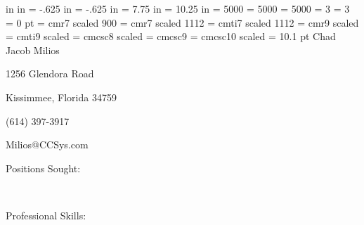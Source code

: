  in
 in
\hoffset = -.625 in%
\voffset = -.625 in%
\hsize = 7.75 in%
\vsize = 10.25 in%
\nopagenumbers%
\tolerance = 5000%
\hyphenpenalty = 5000%
\exhyphenpenalty = 5000%
\lefthyphenmin = 3%
\righthyphenmin = 3%
\parindent = 0 pt%
\font\myfp = cmr7 scaled 900%
\font\myrm = cmr7 scaled 1112%
\font\myit = cmti7 scaled 1112%
\font\mybigrm = cmr9 scaled \magstephalf%
\font\mybigit = cmti9 scaled \magstephalf%
\font\mylilcsc = cmcsc8 scaled \magstephalf%
\font\mycsc = cmcsc9%
\font\mybigcsc = cmcsc10 scaled %
\baselineskip = 10.1 pt
{%
	\mybigcsc%
	\hfil%
	Chad Jacob Milios%
	\hfil%
}%
\smallskip%
{%
	\mycsc%
	\hfil%
	1256 Glendora Road%
	\hfil%
	\par%
	\hfil%
	Kissimmee, Florida 34759%
	\hfil%
	\par%
	\hfil%
	(614) 397-3917%
	\hfil%
	\par%
	\hfil%
	Milios@CCSys.com%
	\hfil%
}%
\bigskip%
{%
	\mycsc%
	Positions Sought:%
	\hfil%
	\par%
}%
\medskip%
\hbox{%
	\vtop{%
		\hsize = .125 in%
		\hfil%
	}%
}%
\bigskip%
{%
	\mycsc%
	Professional Skills:%
	\hfil%
	\par%
}%
\medskip%
